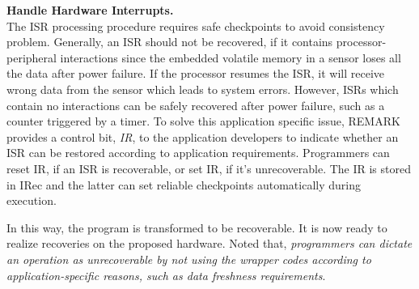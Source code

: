 %
\noindent\textbf{Handle Hardware Interrupts.} \\
%
The ISR processing procedure requires safe checkpoints to avoid consistency problem.
Generally, an ISR should not be recovered, if it contains processor-peripheral interactions since the embedded volatile memory in a sensor loses all the data after power failure.
If the processor resumes the ISR, it will receive wrong data from the sensor which leads to system errors.
However, ISRs which contain no interactions can be safely recovered after power failure, such as a counter triggered by a timer.
To solve this application specific issue, REMARK provides a control bit, \emph{IR}, to the application developers to indicate whether an ISR can be restored according to application requirements.
Programmers can reset IR, if an ISR is recoverable, or set IR, if it's unrecoverable.
The IR is stored in IRec and the latter can set reliable checkpoints automatically during execution.

%
In this way, the program is transformed to be recoverable.
It is now ready to realize recoveries on the proposed hardware. 
Noted that, \emph{programmers can dictate an operation as unrecoverable by not using the wrapper codes according to application-specific reasons, such as data freshness requirements}.